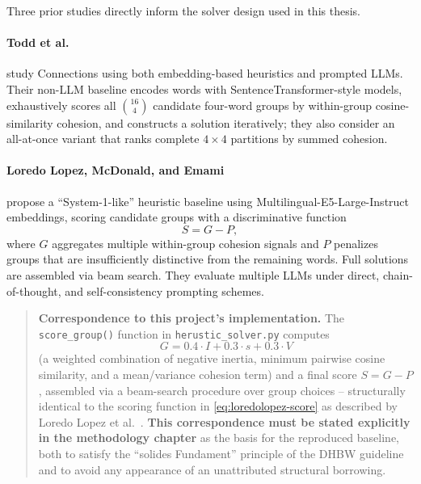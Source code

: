 \label{sec:related-work}

Three prior studies directly inform the solver design used in this
thesis.

\paragraph{Todd et al.~\cite{toddetal2024}} study Connections using both
embedding-based heuristics and prompted LLMs. Their non-LLM baseline
encodes words with SentenceTransformer-style models, exhaustively scores
all $\binom{16}{4}$ candidate four-word groups by within-group
cosine-similarity cohesion, and constructs a solution iteratively; they
also consider an all-at-once variant that ranks complete $4\times4$
partitions by summed cohesion.

\paragraph{Loredo Lopez, McDonald, and Emami~\cite{loredolopez2025}}
propose a ``System-1-like'' heuristic baseline using
Multilingual-E5-Large-Instruct embeddings, scoring candidate groups with
a discriminative function
\begin{equation}
  S = G - P,
  \label{eq:loredolopez-score}
\end{equation}
where $G$ aggregates multiple within-group cohesion signals and $P$
penalizes groups that are insufficiently distinctive from the remaining
words. Full solutions are assembled via beam search. They evaluate
multiple LLMs under direct, chain-of-thought, and self-consistency
prompting schemes.

\begin{quote}
\noindent\textbf{Correspondence to this project's implementation.} The
\texttt{score\_group()} function in \texttt{herustic\_solver.py} computes
\[
  G = 0.4 \cdot I + 0.3 \cdot s + 0.3 \cdot V
\]
(a weighted combination of negative inertia, minimum pairwise cosine
similarity, and a mean/variance cohesion term) and a final score
$S = G - P$, assembled via a beam-search procedure over group choices --
structurally identical to the scoring function in
\autoref{eq:loredolopez-score} as described by Loredo Lopez et
al.~\cite{loredolopez2025}. \textbf{This correspondence must be stated
explicitly in the methodology chapter} as the basis for the reproduced
baseline, both to satisfy the ``solides Fundament'' principle of the
DHBW guideline and to avoid any appearance of an unattributed structural
borrowing.
\end{quote}

